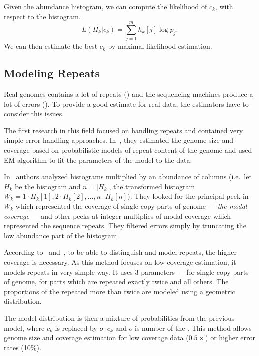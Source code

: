 Given the abundance histogram, we can compute the likelihood of $c_k$, with respect to the histogram.
$$L(H_k | c_k) = \sum_{j=1}^m h_k[j] \log p_j.$$
We can then estimate the best $c_k$ by maximal likelihood estimation.


\subsection{Modeling Repeats}\label{subsec:repeatmodles}

Real genomes contains a lot of repeats () and the sequencing machines produce a lot of errors (). To provide a good estimate for real data, the estimators have to consider this issues.


The first research in this field focused on handling repeats and contained very simple error handling approaches. In~\cite{waterman}, they estimated the genome size and coverage based on probabilistic models of repeat content of the genome and used EM algorithm to fit the parameters of the model to the data.

In~\cite{williams} authors analyzed \kmer histograms multiplied by an abundance of columns (i.e.\ let $H_k$ be the \kmer histogram and $n = |H_k|$, the transformed histogram $W_k = 1 \cdot H_k[1], 2\cdot H_k[2], \dots, n \cdot H_k[n]$). They looked for the principal peek in $W_k$ which represented the coverage of single copy parts of genome --- \emph{the modal coverage} --- and other peeks at integer multiplies of modal coverage which represented the sequence repeats.
They filtered errors simply by truncating the low abundance part of the histogram.

According to~\cite{waterman} and~\cite{williams}, to be able to distinguish and model repeats, the higher coverage is necessary. As this method focuses on low coverage estimation, it models repeats in very simple way. It uses 3 parameters --- for single copy parts of genome, for parts which are repeated exactly twice and all others. The proportions of the \kmers repeated more than twice are modeled using a geometric distribution.

The model distribution is then a mixture of probabilities from the previous model, where $c_k$ is replaced by $o \cdot c_k$ and $o$ is number of the \kmer.
This method allows genome size and coverage estimation for low coverage data ($0.5\times$) or higher error rates (10\%).

